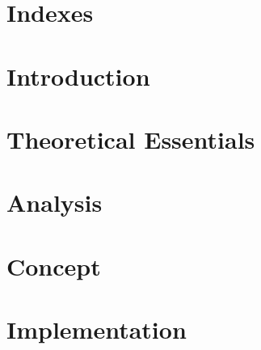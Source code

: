 \documentclass[13pt,pdftex,a4paper]{scrreprt}
\begin{document}


\renewcommand\chaptername{}
\renewcommand\thechapter{}

\pagestyle{plain}
\newpage

%

%

\newpage




\tableofcontents

\pagestyle{fancyStyle}

\chapter*{Indexes}


\listoffigures
\listoftables
\lstlistoflistings

\newpage
\renewcommand\chaptername{Chapter}
\renewcommand\thechapter{\arabic{chapter}}


\chapter{Introduction}


\chapter{Theoretical Essentials}


\chapter{Analysis}


\chapter{Concept}


\chapter{Implementation}

\end{document}
